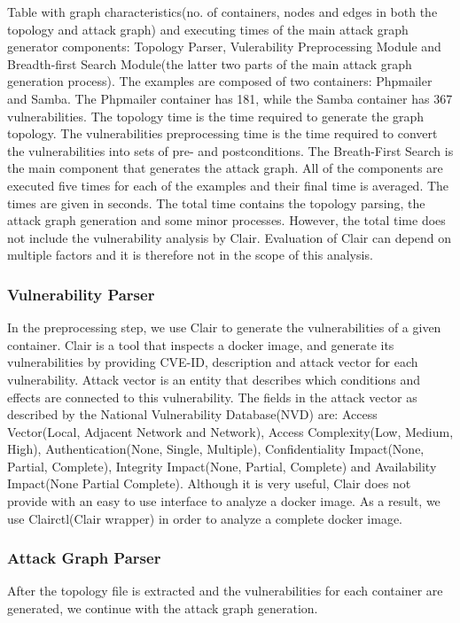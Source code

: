 \documentclass[letterpaper, 10 pt, conference]{ieeeconf}  %
\begin{document}
\begin{table}
	\caption{Table with graph characteristics(no. of containers, nodes and edges in both the topology and attack graph) and executing times of the main attack graph generator components: Topology Parser, Vulerability Preprocessing Module and Breadth-first Search Module(the latter two parts of the main attack graph generation process). The examples are composed of two containers: Phpmailer and Samba. The Phpmailer container has 181, while the Samba container has 367 vulnerabilities. The topology time is the time required to generate the graph topology. The vulnerabilities preprocessing time is the time required to convert the vulnerabilities into sets of pre- and postconditions. The Breath-First Search is the main component that generates the attack graph. All of the components are executed five times for each of the examples and their final time is averaged. The times are given in seconds. The total time contains the topology parsing, the attack graph generation and some minor processes. However, the total time does not include the vulnerability analysis by Clair. Evaluation of Clair can depend on multiple factors and it is therefore not in the scope of this analysis.}
	
	\label{table_scalability}
\end{table}

\subsubsection{Vulnerability Parser}
In the preprocessing step, we use Clair to generate the vulnerabilities of a given container. Clair is a tool that inspects a docker image, and generate its vulnerabilities by providing CVE-ID, description and attack vector for each vulnerability. Attack vector is an entity that describes which conditions and effects are connected to this vulnerability. The fields in the attack vector as described by the National Vulnerability Database(NVD) are: Access Vector(Local, Adjacent Network and Network), Access Complexity(Low, Medium, High), Authentication(None, Single, Multiple), Confidentiality Impact(None, Partial, Complete), Integrity Impact(None, Partial, Complete) and Availability Impact(None Partial Complete). Although it is very useful, Clair does not provide with an easy to use interface to analyze a docker image. As a result, we use Clairctl(Clair wrapper) in order to analyze a complete docker image.


\subsubsection{Attack Graph Parser}
After the topology file is extracted and the vulnerabilities for each container are generated, we continue with the attack graph generation.
\end{document}
